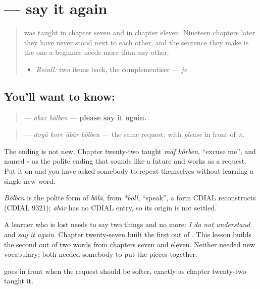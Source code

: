 \section[\texorpdfstring{\bn{আবার} \bn{বলবেন} (ābār bôlben)}{আবার বলবেন (ābār bôlben)}]{  — say it again}

\label{lesson:BN-C19-abar-bolben}



\begin{quote}
\textbf{} was taught in chapter seven and \textbf{} in chapter eleven. Nineteen chapters later they have never stood next to each other, and the sentence they make is the one a beginner needs more than any other.

\begin{itemize}
\raggedright
  \item \emph{Recall:} two items back, the complementiser — \emph{je}
\end{itemize}
\end{quote}

\subsection*{You'll want to know:  }
\begin{quote}
\textbf{ } — \emph{ābār bôlben} — \textbf{please say it again.}
\end{quote}

\begin{quote}
\textbf{   } — \emph{doyā kore ābār bôlben} — the same request, with \emph{please} in front of it.
\end{quote}

The ending is not new. Chapter twenty-two taught \emph{māf kôrben}, \textquotedblleft{}excuse me\textquotedblright{}, and named \textbf{-} as the polite ending that sounds like a future and works as a request. Put it on \textbf{} and you have asked somebody to repeat themselves without learning a single new word.

\begin{cousinweb}
\emph{Bôlben} is the polite form of \emph{bôlā}, from \emph{*bōll}, \textquotedblleft{}speak\textquotedblright{}, a form CDIAL reconstructs (CDIAL 9321); \emph{ābār} has no CDIAL entry, so its origin is not settled.
\end{cousinweb}

\begin{grammarlens}[title={Grammar Lens: the whole repair kit, in two sentences}]
A learner who is lost needs to say two things and no more: \emph{I do not understand} and \emph{say it again}. Chapter twenty-seven built the first out of \textbf{}. This lesson builds the second out of two words from chapters seven and eleven. Neither needed new vocabulary; both needed somebody to put the pieces together.

\textbf{ } goes in front when the request should be softer, exactly as chapter twenty-two taught it.
\end{grammarlens}

